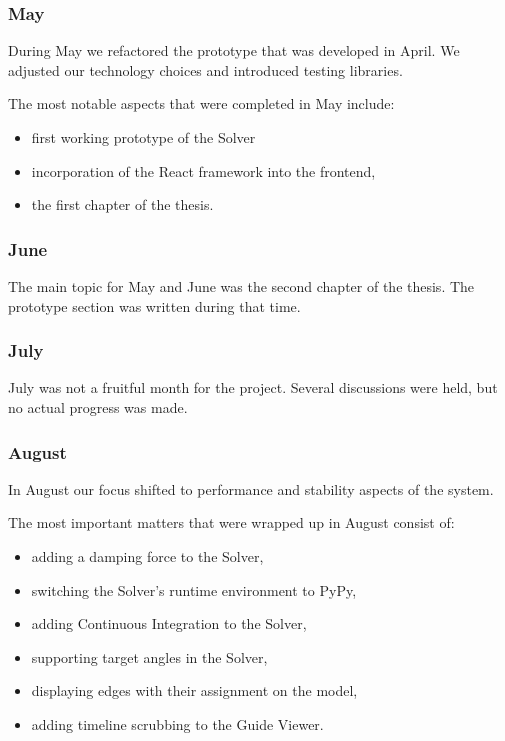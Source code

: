
\subsubsection{May}

During May we refactored the prototype that was developed in April. We adjusted our technology choices and introduced testing libraries.

The most notable aspects that were completed in May include:

\begin{itemize}
	\item first working prototype of the Solver
	\item incorporation of the React framework into the frontend,
	\item the first chapter of the thesis. 
\end{itemize}

\subsubsection{June}

The main topic for May and June was the second chapter of the thesis. The prototype section was written during that time.

\subsubsection{July}

July was not a fruitful month for the project. Several discussions were held, but no actual progress was made.

\subsubsection{August}

In August our focus shifted to performance and stability aspects of the system. 

The most important matters that were wrapped up in August consist of:

\begin{itemize}
	\item adding a damping force to the Solver,
	\item switching the Solver's runtime environment to PyPy,
	\item adding Continuous Integration to the Solver,
	\item supporting target angles in the Solver,
	\item displaying edges with their assignment on the model,
	\item adding timeline scrubbing to the Guide Viewer.
\end{itemize}

